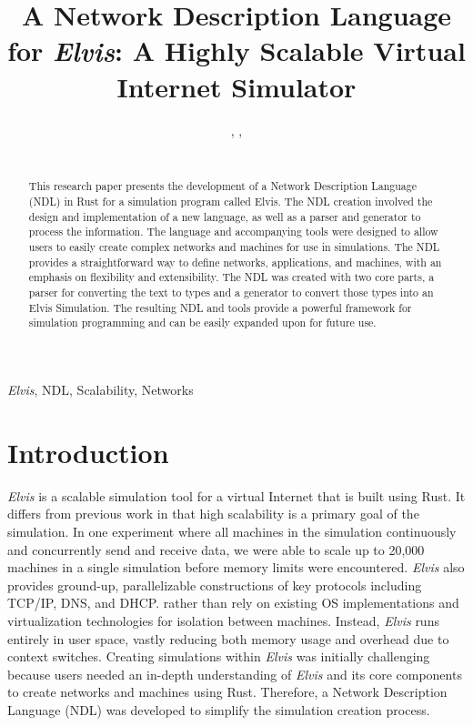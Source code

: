 \documentclass[journal]{IEEEtran} %
\newcommand{\elvis}{\textit{Elvis}}
\begin{document}
\title{A Network Description Language for \elvis{}: A Highly Scalable Virtual Internet Simulator\\}

\author{%
    ,
    ,
    \\%
    \\%
}

\maketitle

\begin{abstract}
This research paper presents the development of a Network Description Language (NDL) in Rust for a simulation program called Elvis. The NDL creation involved the design and implementation of a new language, as well as a parser and generator to process the information. The language and accompanying tools were designed to allow users to easily create complex networks and machines for use in simulations. The NDL provides a straightforward way to define networks, applications, and machines, with an emphasis on flexibility and extensibility. The NDL was created with two core parts, a parser for converting the text to types and a generator to convert those types into an Elvis Simulation. The resulting NDL and tools provide a powerful framework for simulation programming and can be easily expanded upon for future use.

\end{abstract}

\begin{IEEEkeywords}
\elvis{}, NDL, Scalability, Networks
\end{IEEEkeywords}

\section{Introduction}
\elvis{} is a scalable simulation tool for a virtual Internet that is built using Rust. It differs from previous work in that high scalability is a primary goal of the simulation. In one experiment where all machines in the simulation continuously and concurrently send and receive data, we were able to scale up to 20,000 machines in a single simulation before memory limits were encountered. \elvis{} also provides ground-up, parallelizable constructions of key protocols including TCP/IP, DNS, and DHCP. rather than rely on existing OS implementations and virtualization technologies for isolation between machines. Instead, \elvis{} runs entirely in user space, vastly reducing both memory usage and overhead due to context switches.
Creating simulations within \elvis{} was initially challenging because users needed an in-depth understanding of \elvis{} and its core components to create networks and machines using Rust. Therefore, a Network Description Language (NDL) was developed to simplify the simulation creation process.
\end{document}
